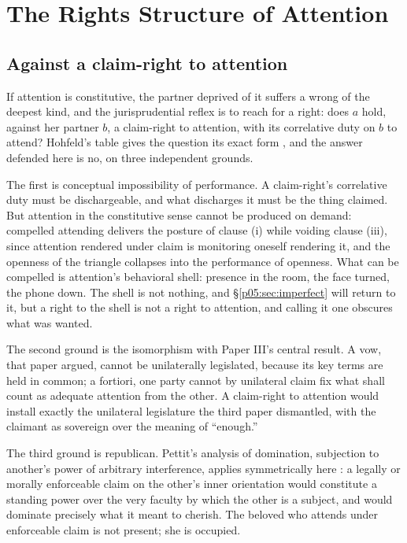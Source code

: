 \documentclass[11pt,a4paper]{article}
\theoremstyle{seriesthm}
\begin{document}
\section{The Rights Structure of Attention}
\label{p05:sec:rights}

\subsection{Against a claim-right to attention}

If attention is constitutive, the partner deprived of it suffers a wrong of the deepest kind, and the jurisprudential reflex is to reach for a right: does $a$ hold, against her partner $b$, a claim-right to attention, with its correlative duty on $b$ to attend? Hohfeld's table gives the question its exact form \parencite{hohfeld1919}, and the answer defended here is no, on three independent grounds.

The first is conceptual impossibility of performance. A claim-right's correlative duty must be dischargeable, and what discharges it must be the thing claimed. But attention in the constitutive sense cannot be produced on demand: compelled attending delivers the posture of clause (i) while voiding clause (iii), since attention rendered under claim is monitoring oneself rendering it, and the openness of the triangle collapses into the performance of openness. What can be compelled is attention's behavioral shell: presence in the room, the face turned, the phone down. The shell is not nothing, and §\ref{p05:sec:imperfect} will return to it, but a right to the shell is not a right to attention, and calling it one obscures what was wanted.

The second ground is the isomorphism with Paper III's central result. A vow, that paper argued, cannot be unilaterally legislated, because its key terms are held in common; a fortiori, one party cannot by unilateral claim fix what shall count as adequate attention from the other. A claim-right to attention would install exactly the unilateral legislature the third paper dismantled, with the claimant as sovereign over the meaning of ``enough.''

The third ground is republican. Pettit's analysis of domination, subjection to another's power of arbitrary interference, applies symmetrically here \parencite{pettit1997}: a legally or morally enforceable claim on the other's inner orientation would constitute a standing power over the very faculty by which the other is a subject, and would dominate precisely what it meant to cherish. The beloved who attends under enforceable claim is not present; she is occupied.
\end{document}
